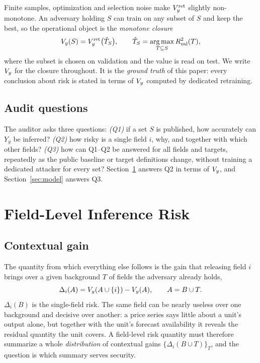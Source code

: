Finite samples, optimization and selection noise make $V_{y}^{\mathrm{ret}}$ slightly
non-monotone. An adversary holding $S$ can train on any subset of $S$ and keep the best, so
the operational object is the \emph{monotone closure}
\begin{equation}\label{eq:closure}
V_{y}(S) = V_{y}^{\mathrm{ret}}\big(\hat T_S\big), \qquad
\hat T_S = \operatorname*{arg\,max}_{T \subseteq S} R^{2}_{\mathrm{val}}(T),
\end{equation}
where the subset is chosen on validation and the value is read on test. We write $V_{y}$ for
the closure throughout. It is the \emph{ground truth} of this paper: every conclusion about
risk is stated in terms of $V_{y}$ computed by dedicated retraining.

\subsection{Audit questions}
The auditor asks three questions: \emph{(Q1)} if a set $S$ is published, how accurately can
$Y_y$ be inferred? \emph{(Q2)} how risky is a single field $i$, why, and together with which
other fields? \emph{(Q3)} how can Q1--Q2 be answered for all fields and targets, repeatedly as
the public baseline or target definitions change, without training a dedicated attacker for
every set? Section~\ref{sec:mk} answers Q2 in terms of $V_{y}$, and Section~\ref{sec:model}
answers Q3.

\section{Field-Level Inference Risk}\label{sec:mk}

\subsection{Contextual gain}
The quantity from which everything else follows is the gain that releasing field $i$ brings over a
given background $T$ of fields the adversary already holds,
\begin{equation}\label{eq:delta}
\Delta_i(A)=V_{y}(A \cup \{i\}) - V_{y}(A),\qquad A=B\cup T .
\end{equation}
$\Delta_i(B)$ is the single-field risk. The same field can be nearly useless over one background
and decisive over another: a price series says little about a unit's output alone, but together
with the unit's forecast availability it reveals the residual quantity the unit covers. A
field-level risk quantity must therefore summarize a whole \emph{distribution} of contextual gains
$\{\Delta_i(B\cup T)\}_T$, and the question is which summary serves security.

